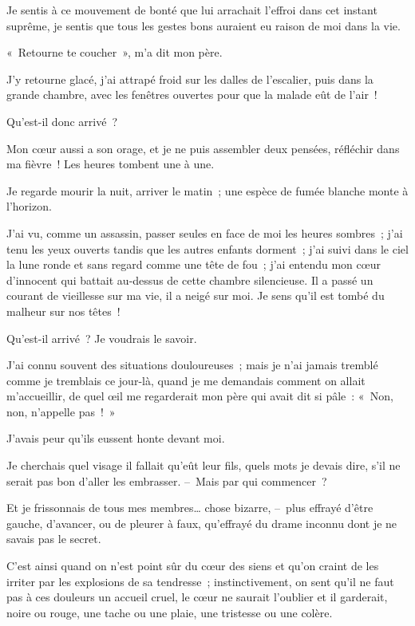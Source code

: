 \documentclass[french,twoside]{book} %
\begin{document}
Je sentis à ce mouvement de bonté que lui arrachait l’effroi dans cet instant suprême, je sentis que tous les gestes bons auraient eu raison de moi dans la vie.\par
« Retourne te coucher », m’a dit mon père.\par
J’y retourne glacé, j’ai attrapé froid sur les dalles de l’escalier, puis dans la grande chambre, avec les fenêtres ouvertes pour que la malade eût de l’air !\par
\bigbreak
\noindent Qu’est-il donc arrivé ?\par
Mon cœur aussi a son orage, et je ne puis assembler deux pensées, réfléchir dans ma fièvre ! Les heures tombent une à une.\par
Je regarde mourir la nuit, arriver le matin ; une espèce de fumée blanche monte à l’horizon.\par
J’ai vu, comme un assassin, passer seules en face de moi les heures sombres ; j’ai tenu les yeux ouverts tandis que les autres enfants dorment ; j’ai suivi dans le ciel la lune ronde et sans regard comme une tête de fou ; j’ai entendu mon cœur d’innocent qui battait au-dessus de cette chambre silencieuse. Il a passé un courant de vieillesse sur ma vie, il a neigé sur moi. Je sens qu’il est tombé du malheur sur nos têtes !\par
\bigbreak
\noindent Qu’est-il arrivé ? Je voudrais le savoir.\par
J’ai connu souvent des situations douloureuses ; mais je n’ai jamais tremblé comme je tremblais ce jour-là, quand je me demandais comment on allait m’accueillir, de quel œil me regarderait mon père qui avait dit si pâle : « Non, non, n’appelle pas ! »\par
J’avais peur qu’ils eussent honte devant moi.\par
Je cherchais quel visage il fallait qu’eût leur fils, quels mots je devais dire, s’il ne serait pas bon d’aller les embrasser. – Mais par qui commencer ?\par
Et je frissonnais de tous mes membres… chose bizarre, – plus effrayé d’être gauche, d’avancer, ou de pleurer à faux, qu’effrayé du drame inconnu dont je ne savais pas le secret.\par
C’est ainsi quand on n’est point sûr du cœur des siens et qu’on craint de les irriter par les explosions de sa tendresse ; instinctivement, on sent qu’il ne faut pas à ces douleurs un accueil cruel, le cœur ne saurait l’oublier et il garderait, noire ou rouge, une tache ou une plaie, une tristesse ou une colère.\par
\end{document}
